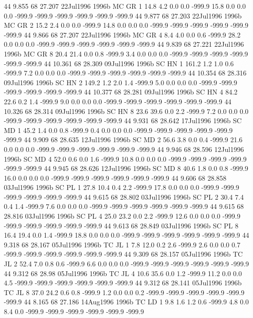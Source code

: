 44 9.855	68 27.207	22Jul1996	1996b	MC	GR	1	14.8	4.2	0.0	0.0	-999.9	15.8	0.0	0.0	0.0	-999.9	-999.9	-999.9	-999.9	-999.9	-999.9
44 9.877	68 27.203	22Jul1996	1996b	MC	GR	2	15.2	2.4	0.0	0.0	-999.9	14.8	0.0	0.0	0.0	-999.9	-999.9	-999.9	-999.9	-999.9	-999.9
44 9.866	68 27.207	22Jul1996	1996b	MC	GR	4	8.4	4.0	0.0	0.6	-999.9	28.2	0.0	0.0	0.0	-999.9	-999.9	-999.9	-999.9	-999.9	-999.9
44 9.839	68 27.221	22Jul1996	1996b	MC	GR	8	20.4	21.4	0.0	0.8	-999.9	3.4	0.0	0.0	0.0	-999.9	-999.9	-999.9	-999.9	-999.9	-999.9
44 10.361	68 28.309	09Jul1996	1996b	SC	HN	1	161.2	1.2	1.0	0.6	-999.9	7.2	0.0	0.0	0.0	-999.9	-999.9	-999.9	-999.9	-999.9	-999.9
44 10.354	68 28.316	09Jul1996	1996b	SC	HN	2	149.2	1.2	2.0	1.4	-999.9	5.0	0.0	0.0	0.0	-999.9	-999.9	-999.9	-999.9	-999.9	-999.9
44 10.377	68 28.281	09Jul1996	1996b	SC	HN	4	84.2	22.6	0.2	1.4	-999.9	9.0	0.0	0.0	0.0	-999.9	-999.9	-999.9	-999.9	-999.9	-999.9
44 10.326	68 28.314	09Jul1996	1996b	SC	HN	8	23.6	39.6	0.0	2.2	-999.9	7.2	0.0	0.0	0.0	-999.9	-999.9	-999.9	-999.9	-999.9	-999.9
44 9.931	68 28.642	17Jul1996	1996b	SC	MD	1	45.2	1.4	0.0	0.8	-999.9	0.4	0.0	0.0	0.0	-999.9	-999.9	-999.9	-999.9	-999.9	-999.9
44 9.909	68 28.635	12Jul1996	1996b	SC	MD	2	56.6	3.8	0.0	0.4	-999.9	21.6	0.0	0.0	0.0	-999.9	-999.9	-999.9	-999.9	-999.9	-999.9
44 9.946	68 28.596	12Jul1996	1996b	SC	MD	4	52.0	0.6	0.0	1.6	-999.9	10.8	0.0	0.0	0.0	-999.9	-999.9	-999.9	-999.9	-999.9	-999.9
44 9.945	68 28.626	12Jul1996	1996b	SC	MD	8	40.6	1.8	0.0	0.8	-999.9	16.0	0.0	0.0	0.0	-999.9	-999.9	-999.9	-999.9	-999.9	-999.9
44 9.606	68 28.858	03Jul1996	1996b	SC	PL	1	27.8	10.4	0.4	2.2	-999.9	17.8	0.0	0.0	0.0	-999.9	-999.9	-999.9	-999.9	-999.9	-999.9
44 9.615	68 28.802	03Jul1996	1996b	SC	PL	2	30.4	7.4	0.4	1.4	-999.9	7.6	0.0	0.0	0.0	-999.9	-999.9	-999.9	-999.9	-999.9	-999.9
44 9.615	68 28.816	03Jul1996	1996b	SC	PL	4	25.0	23.2	0.0	2.2	-999.9	12.6	0.0	0.0	0.0	-999.9	-999.9	-999.9	-999.9	-999.9	-999.9
44 9.613	68 28.849	03Jul1996	1996b	SC	PL	8	16.4	19.4	0.0	1.4	-999.9	18.8	0.0	0.0	0.0	-999.9	-999.9	-999.9	-999.9	-999.9	-999.9
44 9.318	68 28.167	05Jul1996	1996b	TC	JL	1	7.8	12.0	0.2	2.6	-999.9	2.6	0.0	0.0	0.7	-999.9	-999.9	-999.9	-999.9	-999.9	-999.9
44 9.309	68 28.157	05Jul1996	1996b	TC	JL	2	52.4	7.0	0.8	0.6	-999.9	6.6	0.0	0.0	0.0	-999.9	-999.9	-999.9	-999.9	-999.9	-999.9
44 9.312	68 28.98	05Jul1996	1996b	TC	JL	4	10.6	35.6	0.0	1.2	-999.9	11.2	0.0	0.0	4.5	-999.9	-999.9	-999.9	-999.9	-999.9	-999.9
44 9.312	68 28.141	05Jul1996	1996b	TC	JL	8	37.0	24.2	0.6	0.8	-999.9	1.2	0.0	0.0	0.2	-999.9	-999.9	-999.9	-999.9	-999.9	-999.9
44 8.165	68 27.186	14Aug1996	1996b	TC	LD	1	9.8	1.6	1.2	0.6	-999.9	4.8	0.0	8.4	0.0	-999.9	-999.9	-999.9	-999.9	-999.9	-999.9
